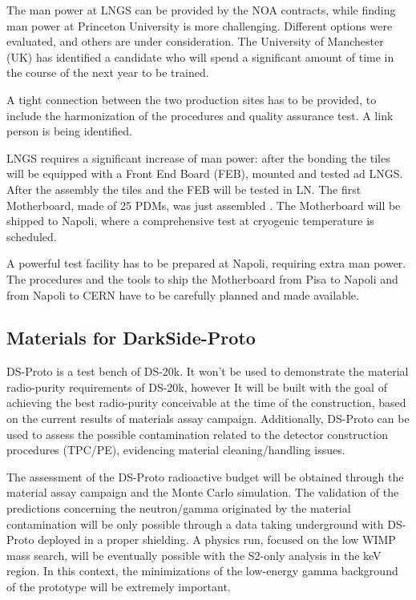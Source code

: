 The man power at LNGS can be provided by the NOA contracts, while finding man power at Princeton University is more challenging. Different options were evaluated, and others are under consideration. 
The University of Manchester (UK) has identified a candidate who will
spend a significant amount of time in the course of the next year to be
trained.

A tight connection between the two production sites has to be provided, to include the harmonization of the procedures and quality assurance test. A link person is being identified.

LNGS requires a significant increase of man power: after the bonding the tiles will be equipped with a Front End Board (FEB), mounted and tested ad LNGS. After the assembly the tiles and the FEB will be tested in LN.  The first Motherboard, made of 25 PDMs, was just assembled .
The Motherboard will be shipped to Napoli, where a comprehensive test at cryogenic temperature is scheduled.

A powerful test facility has to be prepared at Napoli, requiring extra man power. The procedures and the tools to ship the Motherboard from Pisa to Napoli and from Napoli to CERN have to be carefully planned and made available. 

\subsection{Materials for DarkSide-Proto}

DS-Proto is a test bench of DS-20k. It won't be used to demonstrate the material radio-purity requirements of DS-20k, however It will be built with the goal of achieving the best radio-purity conceivable at the time of the construction, based on the current results of materials assay campaign. Additionally, DS-Proto can be used to assess the possible contamination related to the detector construction procedures (TPC/PE), evidencing material cleaning/handling issues.

The assessment of the DS-Proto radioactive budget will be obtained through the material assay campaign and the Monte Carlo simulation. The validation of the predictions concerning the neutron/gamma originated by the material contamination will be only possible through a data taking underground with DS-Proto deployed in a proper shielding. A physics run, focused on the low WIMP mass search, will be eventually possible with the S2-only analysis in the keV region. In this context, the minimizations of the low-energy gamma background of the prototype will be extremely important.


